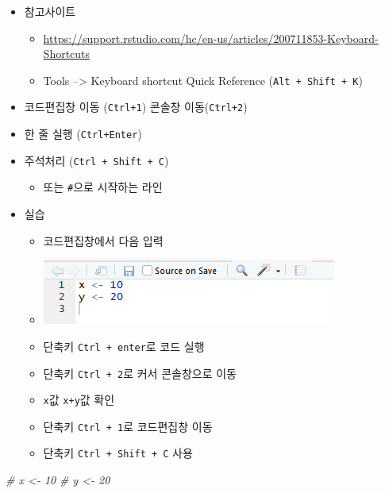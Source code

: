 \documentclass[
]{book}
\newenvironment{Shaded}{\begin{snugshade}}{\end{snugshade}}
\newcommand{\CommentTok}[1]{\textcolor[rgb]{0.56,0.35,0.01}{\textit{#1}}}
\providecommand{\tightlist}{%
  \setlength{\itemsep}{0pt}\setlength{\parskip}{0pt}}
\begin{document}
\begin{itemize}
\tightlist
\item
  참고사이트

  \begin{itemize}
  \tightlist
  \item
    \url{https://support.rstudio.com/hc/en-us/articles/200711853-Keyboard-Shortcuts}
  \item
    Tools --\textgreater{} Keyboard shortcut Quick Reference (\texttt{Alt\ +\ Shift\ +\ K})
  \end{itemize}
\item
  코드편집창 이동 (\texttt{Ctrl+1}) 콘솔창 이동(\texttt{Ctrl+2})
\item
  한 줄 실행 (\texttt{Ctrl+Enter})
\item
  주석처리 (\texttt{Ctrl\ +\ Shift\ +\ C})

  \begin{itemize}
  \tightlist
  \item
    또는 \texttt{\#}으로 시작하는 라인
  \end{itemize}
\item
  실습

  \begin{itemize}
  \tightlist
  \item
    코드편집창에서 다음 입력
  \item
    \includegraphics{images/01/01-14.PNG}\\
  \item
    단축키 \texttt{Ctrl\ +\ enter}로 코드 실행
  \item
    단축키 \texttt{Ctrl\ +\ 2}로 커서 콘솔창으로 이동
  \item
    \texttt{x}값 \texttt{x+y}값 확인
  \item
    단축키 \texttt{Ctrl\ +\ 1}로 코드편집창 이동
  \item
    단축키 \texttt{Ctrl\ +\ Shift\ +\ C} 사용
  \end{itemize}
\end{itemize}

\begin{Shaded}
\begin{Highlighting}[]
\CommentTok{\# x \textless{}{-} 10}
\CommentTok{\# y \textless{}{-} 20}
\end{Highlighting}
\end{Shaded}
\end{document}
